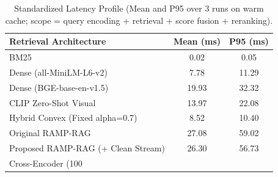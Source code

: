 \begin{table}[t]
\centering
\caption{Standardized Latency Profile (Mean and P95 over 3 runs on warm cache; scope = query encoding + retrieval + score fusion + reranking).}
\label{tab:standardized_latency}
\begin{tabular}{lcc}
\hline
\textbf{Retrieval Architecture} & \textbf{Mean (ms)} & \textbf{P95 (ms)} \\
\hline
BM25 & 0.02 & 0.05 \\
Dense (all-MiniLM-L6-v2) & 7.78 & 11.29 \\
Dense (BGE-base-en-v1.5) & 19.93 & 32.32 \\
CLIP Zero-Shot Visual & 13.97 & 22.08 \\
Hybrid Convex (Fixed alpha=0.7) & 8.52 & 10.40 \\
Original RAMP-RAG & 27.08 & 59.02 \\
Proposed RAMP-RAG (+ Clean Stream) & 26.30 & 56.73 \\
Cross-Encoder (100%
\hline
\end{tabular}
\end{table}
